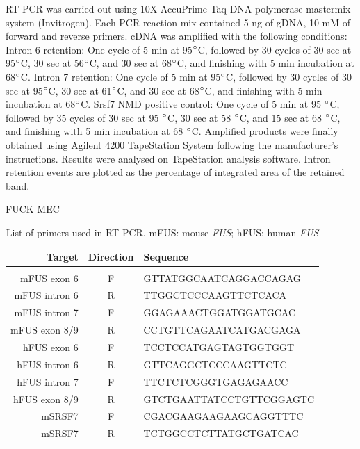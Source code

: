 RT-PCR was carried out using 10X AccuPrime Taq DNA polymerase mastermix system (Invitrogen). 
Each PCR reaction mix contained 5 ng of gDNA, 10 mM of forward and reverse primers. cDNA was amplified with the following conditions:
Intron 6 retention: One cycle of 5 min at 95$\degree$C, followed by 30 cycles of 30 sec at 95$\degree$C, 30 sec at 56$\degree$C, and 30 sec at 68$\degree$C, and finishing with 5 min incubation at 68$\degree$C.
Intron 7 retention: One cycle of 5 min at 95$\degree$C, followed by 30 cycles of 30 sec at 95$\degree$C, 30 sec at 61$\degree$C, and 30 sec at 68$\degree$C, and finishing with 5 min incubation at 68$\degree$C.
Srsf7 NMD positive control: One cycle of 5 min at 95 $\degree$C, followed by 35 cycles of 30 sec at 95 $\degree$C, 30 sec at 58 $\degree$C, and 15 sec at 68 $\degree$C, and finishing with 5 min incubation at 68 $\degree$C.
Amplified products were finally obtained using Agilent 4200 TapeStation System following the manufacturer’s instructions. Results were analysed on TapeStation analysis software.
Intron retention events are plotted  as the percentage of integrated area of the retained band.

FUCK MEC

\begin{table}[h!]
	\centering
	\begin{tabular}{rcl}
		\textbf{Target} & \textbf{Direction} & \textbf{Sequence}\\
		\hline \\[-0.3cm]
		mFUS exon 6  & F &  GTTATGGCAATCAGGACCAGAG\\
		mFUS intron 6 & R & TTGGCTCCCAAGTTCTCACA\\
		mFUS intron 7 & F &  GGAGAAACTGGATGGATGCAC\\
		mFUS exon 8/9 & R &  CCTGTTCAGAATCATGACGAGA\\[0.2cm]
		hFUS exon 6 & F & TCCTCCATGAGTAGTGGTGGT \\
		hFUS intron 6 & R & GTTCAGGCTCCCAAGTTCTC\\
		hFUS intron 7 & F & TTCTCTCGGGTGAGAGAACC\\
		hFUS exon 8/9 & R & GTCTGAATTATCCTGTTCGGAGTC\\[0.2cm]
		mSRSF7 & F &  CGACGAAGAAGAAGCAGGTTTC\\
		mSRSF7& R & TCTGGCCTCTTATGCTGATCAC\\
	\end{tabular}
	\caption{List of primers used in RT-PCR. mFUS: mouse \textit{FUS}; hFUS: human \textit{FUS}}
	\label{tab:fus_primers}
\end{table}




